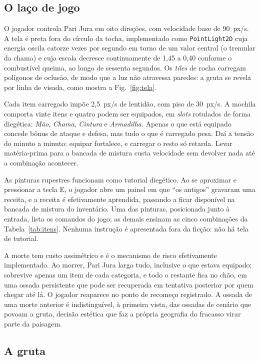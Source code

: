 \documentclass[conference]{IEEEtran}
\begin{document}
\subsection{O laço de jogo}

O jogador controla Pari Jura em oito direções, com velocidade base de 90~px/s. A tela é
preta fora do círculo da tocha, implementado como \texttt{PointLight2D} cuja energia
oscila catorze vezes por segundo em torno de um valor central (o tremular da chama) e
cuja escala decresce continuamente de 1{,}45 a 0{,}40 conforme o combustível queima, ao
longo de sessenta segundos. Os \textit{tiles} de rocha carregam polígonos de oclusão, de
modo que a luz não atravessa paredes: a gruta se revela por linha de visada, como mostra
a Fig.~\ref{fig:tela}.

Cada item carregado impõe 2{,}5~px/s de lentidão, com piso de 30~px/s. A mochila
comporta vinte itens e quatro podem ser equipados, em \textit{slots} rotulados de forma
diegética: \textit{Mão}, \textit{Chama}, \textit{Cintura} e \textit{Armadilha}. Apenas o
que está equipado concede bônus de ataque e defesa, mas tudo o que é carregado pesa. Daí
a tensão do minuto a minuto: equipar fortalece, e carregar o resto só retarda. Levar
matéria-prima para a bancada de mistura custa velocidade sem devolver nada até a
combinação acontecer.

As pinturas rupestres funcionam como tutorial diegético. Ao se aproximar e pressionar a
tecla E, o jogador abre um painel em que ``os antigos'' gravaram uma receita, e a
receita é efetivamente aprendida, passando a ficar disponível na bancada de mistura do
inventário. Uma das pinturas, posicionada junto à entrada, lista os comandos do jogo; as
demais ensinam as cinco combinações da Tabela~\ref{tab:itens}. Nenhuma instrução é
apresentada fora da ficção: não há tela de tutorial.

A morte tem custo assimétrico e é o mecanismo de risco efetivamente implementado. Ao
morrer, Pari Jura larga tudo, inclusive o que estava equipado; sobrevive apenas um item
de cada categoria, e todo o restante fica no chão, em uma ossada persistente que pode
ser recuperada em tentativa posterior por quem chegar até lá. O jogador reaparece no
ponto de recomeço registrado. A ossada de uma morte anterior é indistinguível, à
primeira vista, das ossadas de cenário que povoam a gruta, decisão estética que faz a
própria geografia do fracasso virar parte da paisagem.

\subsection{A gruta}
\end{document}
